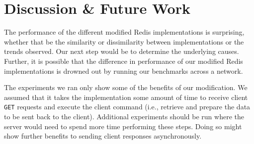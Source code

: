 \documentclass[sigconf, screen]{acmart}
\newcommand{\inlinecode}[1]{\texttt{#1}}
\begin{document}
%
%
%

\section{Discussion \& Future Work}
The performance of the different modified Redis implementations is surprising, whether that be the similarity or dissimilarity between implementations or the trends observed.
Our next step would be to determine the underlying causes.
Further, it is possible that the difference in performance of our modified Redis implementations is drowned out by running our benchmarks across a network.

The experiments we ran only show some of the benefits of our modification.
We assumed that it takes the implementation some amount of time to receive client \inlinecode{GET} requests and execute the client command (i.e., retrieve and prepare the data to be sent back to the client).
Additional experiments should be run where the server would need to spend more time performing these steps.
Doing so might show further benefits to sending client responses asynchronously.
\end{document}
